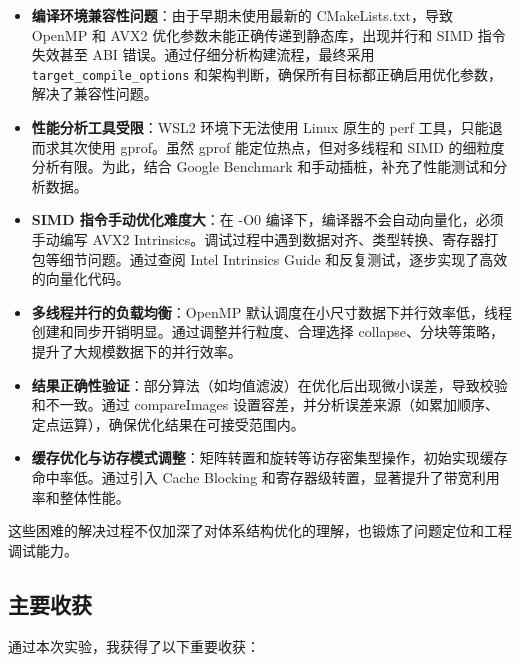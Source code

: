 \documentclass[a4paper]{article}
\begin{document}
\begin{itemize}
    \item \textbf{编译环境兼容性问题}：由于早期未使用最新的 CMakeLists.txt，导致 OpenMP 和 AVX2 优化参数未能正确传递到静态库，出现并行和 SIMD 指令失效甚至 ABI 错误。通过仔细分析构建流程，最终采用 \texttt{target\_compile\_options} 和架构判断，确保所有目标都正确启用优化参数，解决了兼容性问题。
    \item \textbf{性能分析工具受限}：WSL2 环境下无法使用 Linux 原生的 perf 工具，只能退而求其次使用 gprof。虽然 gprof 能定位热点，但对多线程和 SIMD 的细粒度分析有限。为此，结合 Google Benchmark 和手动插桩，补充了性能测试和分析数据。
    \item \textbf{SIMD 指令手动优化难度大}：在 -O0 编译下，编译器不会自动向量化，必须手动编写 AVX2 Intrinsics。调试过程中遇到数据对齐、类型转换、寄存器打包等细节问题。通过查阅 Intel Intrinsics Guide 和反复测试，逐步实现了高效的向量化代码。
    \item \textbf{多线程并行的负载均衡}：OpenMP 默认调度在小尺寸数据下并行效率低，线程创建和同步开销明显。通过调整并行粒度、合理选择 collapse、分块等策略，提升了大规模数据下的并行效率。
    \item \textbf{结果正确性验证}：部分算法（如均值滤波）在优化后出现微小误差，导致校验和不一致。通过 compareImages 设置容差，并分析误差来源（如累加顺序、定点运算），确保优化结果在可接受范围内。
    \item \textbf{缓存优化与访存模式调整}：矩阵转置和旋转等访存密集型操作，初始实现缓存命中率低。通过引入 Cache Blocking 和寄存器级转置，显著提升了带宽利用率和整体性能。
\end{itemize}

这些困难的解决过程不仅加深了对体系结构优化的理解，也锻炼了问题定位和工程调试能力。

\subsection{主要收获}

通过本次实验，我获得了以下重要收获：
\end{document}
